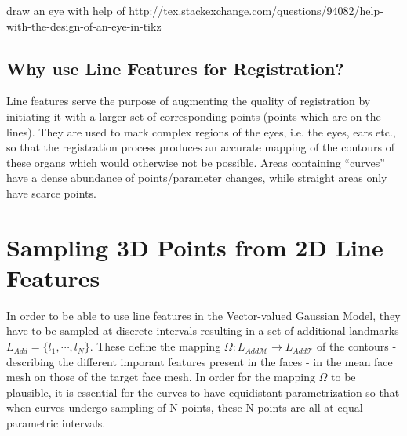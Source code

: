 \def\eyepath{(-3,0) .. controls (-2,1.8) and (2,2.2) .. (2.7,0) .. controls (2,-1.2) and (-2,-1.4) .. (-3,0)--cycle;}


draw an eye with help of http://tex.stackexchange.com/questions/94082/help-with-the-design-of-an-eye-in-tikz

\subsection{Why use Line Features for Registration?} 
Line features serve the purpose of augmenting the quality of registration by initiating it with a larger set of corresponding points (points which are on the lines). They are used to mark complex regions of the eyes, i.e. the eyes, ears etc., so that the registration process produces an accurate mapping of the contours of these organs which would otherwise not be possible.  Areas containing ``curves'' have a dense abundance of points/parameter changes, while straight areas only have scarce points.  

\section{Sampling 3D Points from 2D Line Features} 
In order to be able to use line features in the Vector-valued Gaussian Model, they have to be sampled at discrete intervals resulting in a set of additional landmarks $L_{Add} = \{l_{1}, \cdots, l_{N}\}$. These define the mapping $\Omega:L_{Add\mathcal{M}} \rightarrow L_{Add\mathcal{T}}$ of the contours - describing the different imporant features present in the faces - in the mean face mesh on those of the target face mesh. In order for the mapping $\Omega$ to be plausible, it is essential
for the curves to have equidistant parametrization so that when curves undergo sampling of N points, these N points are all at equal parametric intervals.

